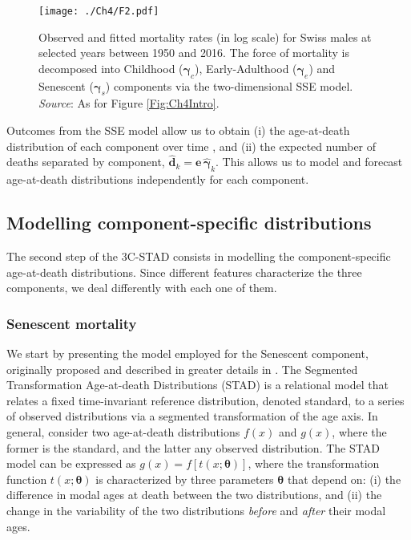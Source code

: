 \documentclass[Thesis]{subfiles}
\begin{document}
\begin{figure}[!ht]
	\begin{center}
		\texttt{[image: ./Ch4/F2.pdf]}
		\caption{Observed and fitted mortality rates (in log scale) for Swiss males at selected years between 1950 and 2016. The force of mortality is decomposed into Childhood ($\bm{\gamma}_c$), Early-Adulthood ($\bm{\gamma}_e$) and Senescent ($\bm{\gamma}_s$) components via the two-dimensional SSE model.\\\footnotesize{\textit{Source}: As for Figure \ref{Fig:Ch4Intro}.} \label{Fig:SSEexample}}		
	\end{center}
\end{figure}

Outcomes from the SSE model allow us to obtain (i) the age-at-death distribution of each component over time \cite[using standard life-table construction,][]{preston2001demogr}, and (ii) the expected number of deaths separated by component, $\hat{\bm{d}}_k=\bm{e}\,\hat{\bm{\gamma}}_k$. This allows us to model and forecast age-at-death distributions independently for each component. 


\subsection{Modelling component-specific distributions}\label{Subsec:Ch4subsec2.3}

The second step of the 3C-STAD consists in modelling the component-specific age-at-death distributions. Since different features characterize the three components, we deal differently with each one of them. 

\subsubsection{Senescent mortality}
We start by presenting the model employed for the Senescent component, originally proposed and described in greater details in \cite{basellini2019modelling}.
The Segmented Transformation Age-at-death Distributions (STAD) is a relational model that relates a fixed time-invariant reference distribution, denoted standard, to a series of observed distributions via a segmented transformation of the age axis. In general, consider two age-at-death distributions $f(x)$ and $g(x)$, where the former is the standard, and the latter any observed distribution. The STAD model can be expressed as $g(x) = f\left[t(x;\bm{\theta})\right]$, where the transformation function $t(x;\bm{\theta})$ is characterized by three parameters $\bm{\theta}$ that depend on: (i) the difference in modal ages at death between the two distributions, and (ii) the change in the variability of the two distributions  \textit{before} and \textit{after} their modal ages. 
\end{document}
